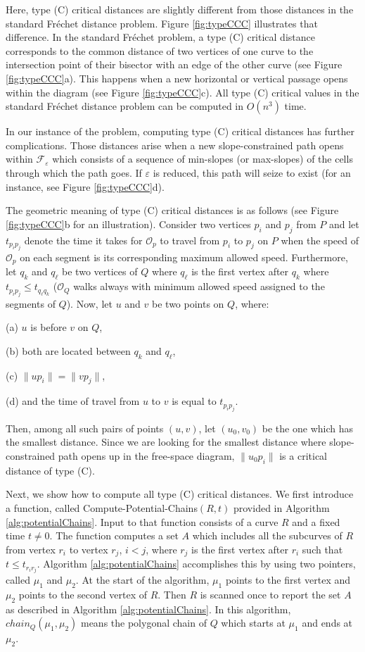 \documentclass[12pt]{dalthesis}
\newcommand{\eps}{\varepsilon}
\newcommand{\CF}{{\mathscr F}}
\newcommand{\Frechet}{Fr\'echet }
\newcommand{\CO}{{\mathscr O}}
\newcommand{\Feps}{\CF_\eps}
\begin{document}
Here, type (C) critical distances are slightly different from 
those distances in the standard 
\Frechet distance problem. 
Figure \ref{fig:typeCCC} illustrates that difference. 
In the standard \Frechet problem, a type (C) critical distance
corresponds to the common distance of two vertices of one curve 
to the intersection point of their bisector 
with an edge of the other curve (see Figure \ref{fig:typeCCC}a). This happens 
when a new horizontal or vertical passage opens within the diagram
(see Figure \ref{fig:typeCCC}c).
All  type (C) critical values in the standard \Frechet distance problem 
can be computed in $O(n^3)$ time. 

In our instance of the problem, computing type (C) critical distances
has further complications.  
Those distances arise when a new slope-constrained path opens within $\Feps$
which consists of a sequence of min-slopes (or max-slopes)
of the cells through which the path goes.
If $\eps$ is reduced, this path will seize to exist 
(for an instance, see Figure \ref{fig:typeCCC}d).

The geometric meaning of type (C) critical distances is as follows
(see Figure \ref{fig:typeCCC}b for an illustration).
Consider two vertices $p_i$ and $p_j$ from $P$ and
let $t_{p_ip_j}$ denote the time it takes for $\CO_p$
to travel from $p_i$ to $p_j$ on $P$ when the speed of $\CO_p$ on each 
segment is its corresponding maximum allowed speed.
Furthermore, let $q_k$ and $q_\ell$
be two vertices of $Q$ where 
$q_\ell$ is the first vertex after $q_k$
where $t_{p_ip_j} \le t_{q_\ell q_k}$ ($\CO_Q$ walks always 
with minimum allowed speed assigned to the segments of $Q$).
Now, let $u$ and $v$  be two points on $Q$,
where: 

(a) $u$ is before $v$ on $Q$,

(b) both are located between $q_k$ and $q_\ell$,

(c) $\|  u p_i\| = \|  v p_j\|$,

(d) and the time of travel from $u$ to $v$ is equal to $t_{p_ip_j}$. 

Then, among all such pairs of points $(u,v)$, 
let $(u_0,v_0)$ be the one which has the smallest distance. Since we are looking for the smallest distance where 
slope-constrained path opens up in the free-space diagram, 
$\| u_0p_i\|$ is a critical distance of type (C).


Next, we show how to compute all type (C) critical distances.
We first introduce a function, called {\sc Compute-Potential-Chains$(R, t)$}
provided in Algorithm \ref{alg:potentialChains}.
Input to that function consists of a curve $R$ and a fixed time $t \neq 0$.
The function computes a set $A$ which includes all 
the subcurves of $R$ from vertex $r_i$ to vertex $r_j$, $i < j$, where $r_j$ 
is the first vertex after $r_i$ such that $t \le t_{r_ir_j}$.
Algorithm \ref{alg:potentialChains} accomplishes this by using two pointers, 
called $\mu_1$ and 
$\mu_2$. At the start of the algorithm, $\mu_1$ points to the 
first vertex and $\mu_2$ points to the second vertex of $R$. 
Then $R$ is scanned once to report the set $A$ as described in 
Algorithm \ref{alg:potentialChains}.
In this algorithm, $chain_Q(\mu_1,\mu_2)$ means the polygonal chain 
of $Q$ which starts at $\mu_1$ and ends at $\mu_2$.
\end{document}
